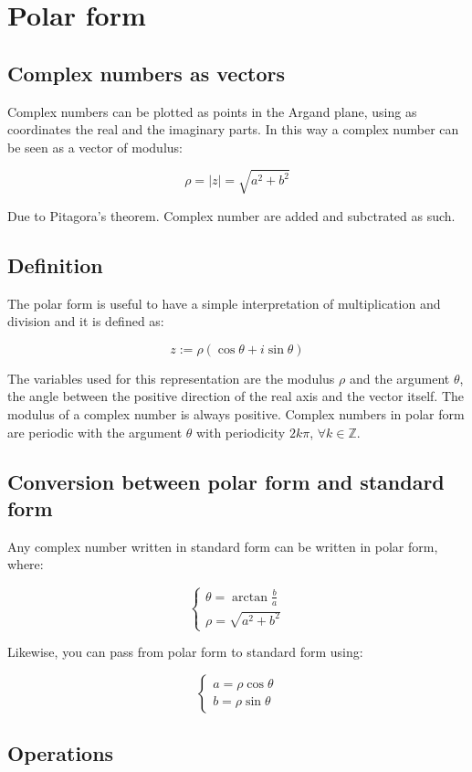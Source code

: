 \section{Polar form}

	\subsection{Complex numbers as vectors}
	Complex numbers can be plotted as points in the Argand plane, using as coordinates the real and the imaginary parts.
	In this way a complex number can be seen as a vector of modulus:

	$$\rho = |z| = \sqrt{a^2+b^2}$$

	Due to Pitagora's theorem.
	Complex number are added and subctrated as such.

	\subsection{Definition}
	The polar form is useful to have a simple interpretation of multiplication and division and it is defined as:

	$$z :=\rho(\cos\theta + i\sin\theta)$$

	The variables used for this representation are the modulus $\rho$ and the argument $\theta$, the angle between the positive direction of the real axis and the vector itself.
	The modulus of a complex number is always positive.
	Complex numbers in polar form are periodic with the argument $\theta$ with periodicity $2k\pi$, $\forall k\in\mathbb{Z}$.

	\subsection{Conversion between polar form and standard form}
	Any complex number written in standard form can be written in polar form, where:

	$$\begin{cases}
		\theta = \arctan \frac{b}{a}\\
		\rho = \sqrt{a^2 + b^2}
	\end{cases}$$

	Likewise, you can pass from polar form to standard form using:

	$$\begin{cases}
		a = \rho\cos\theta\\
		b = \rho\sin\theta
	\end{cases}$$

	\subsection{Operations}

